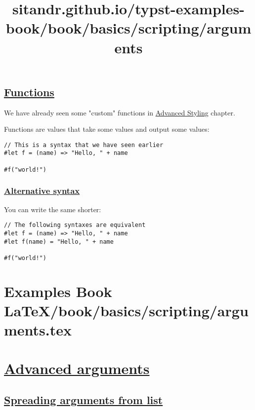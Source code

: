 \subsection{\texorpdfstring{\hyperref[functions]{Functions}}{Functions}}\label{functions}

We have already seen some "custom" functions in
\href{../tutorial/advanced_styling.html}{Advanced Styling} chapter.

Functions are values that take some values and output some values:

\begin{verbatim}
// This is a syntax that we have seen earlier
#let f = (name) => "Hello, " + name

#f("world!")
\end{verbatim}

\pandocbounded{}

\subsubsection{\texorpdfstring{\hyperref[alternative-syntax]{Alternative
syntax}}{Alternative syntax}}\label{alternative-syntax}

You can write the same shorter:

\begin{verbatim}
// The following syntaxes are equivalent
#let f = (name) => "Hello, " + name
#let f(name) = "Hello, " + name

#f("world!")
\end{verbatim}

\pandocbounded{}


\section{Examples Book LaTeX/book/basics/scripting/arguments.tex}
\title{sitandr.github.io/typst-examples-book/book/basics/scripting/arguments}

\section{\texorpdfstring{\hyperref[advanced-arguments]{Advanced
arguments}}{Advanced arguments}}\label{advanced-arguments}

\subsection{\texorpdfstring{\hyperref[spreading-arguments-from-list]{Spreading
arguments from
list}}{Spreading arguments from list}}\label{spreading-arguments-from-list}

